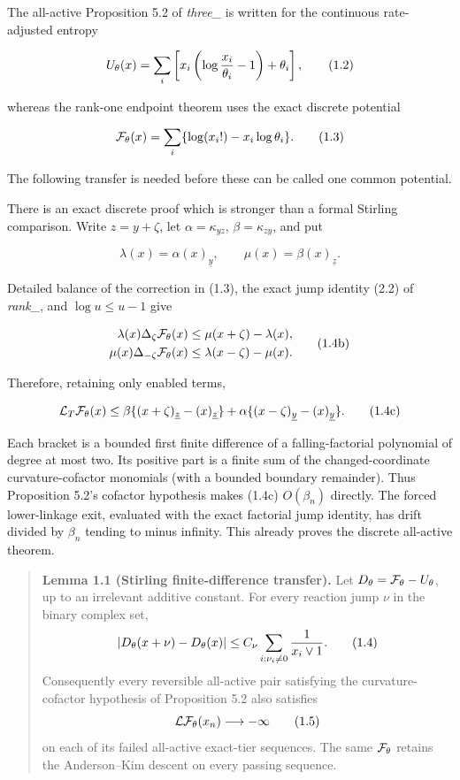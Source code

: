 The all-active Proposition 5.2 of
\emph{three\_\texttt{}} is written for the
continuous rate-adjusted entropy

\[
 U_\theta(x)=\sum_i\left[
   x_i\left(\log{x_i\over\theta_i}-1\right)+\theta_i
 \right],
\tag{1.2}
\]

whereas the rank-one endpoint theorem uses the exact discrete potential

\[
 {\cal F}_\theta(x)=\sum_i\{\log(x_i!)-x_i\log\theta_i\}.
\tag{1.3}
\]

The following transfer is needed before these can be called one common
potential.

There is an exact discrete proof which is stronger than a formal
Stirling comparison. Write \(z=y+\zeta\), let \(\alpha=\kappa_{yz}\),
\(\beta=\kappa_{zy}\), and put

\[
 \lambda(x)=\alpha(x)_{\underline y},\qquad
 \mu(x)=\beta(x)_{\underline z}.
\tag{1.4a}
\]

Detailed balance of the correction in (1.3), the exact jump identity
(2.2) of \emph{rank\_\texttt{}}, and
\(\log u\le u-1\) give

\[
\begin{split}
 \lambda(x)\Delta_\zeta{\cal F}_\theta(x)
 &\le\mu(x+\zeta)-\lambda(x),\\
 \mu(x)\Delta_{-\zeta}{\cal F}_\theta(x)
 &\le\lambda(x-\zeta)-\mu(x).
\end{split}
\tag{1.4b}
\]

Therefore, retaining only enabled terms,

\[
 {\cal L}_T{\cal F}_\theta(x)
 \le\beta\{(x+\zeta)_{\underline z}-(x)_{\underline z}\}
   +\alpha\{(x-\zeta)_{\underline y}-(x)_{\underline y}\}.
\tag{1.4c}
\]

Each bracket is a bounded first finite difference of a falling-factorial
polynomial of degree at most two. Its positive part is a finite sum of
the changed-coordinate curvature-cofactor monomials (with a bounded
boundary remainder). Thus Proposition 5.2's cofactor hypothesis makes
(1.4c) \(O(\beta_n)\) directly. The forced lower-linkage exit, evaluated
with the exact factorial jump identity, has drift divided by \(\beta_n\)
tending to minus infinity. This already proves the discrete all-active
theorem.

\begin{quote}
\textbf{Lemma 1.1 (Stirling finite-difference transfer).} Let
\(D_\theta={\cal F}_\theta-U_\theta\), up to an irrelevant additive
constant. For every reaction jump \(\nu\) in the binary complex set, \[
 |D_\theta(x+\nu)-D_\theta(x)|
 \le C_\nu\sum_{i:\nu_i\ne0}{1\over x_i\vee1}.
\tag{1.4}
\] Consequently every reversible all-active pair satisfying the
curvature-cofactor hypothesis of Proposition 5.2 also satisfies \[
 {\cal L}{\cal F}_\theta(x_n)\longrightarrow-\infty
\tag{1.5}
\] on each of its failed all-active exact-tier sequences. The same
\({\cal F}_\theta\) retains the Anderson--Kim descent on every passing
sequence.
\end{quote}

